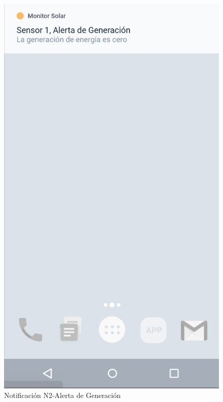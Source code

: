 \begin{figure}[H]
	\centering
	\includegraphics[scale=0.70]{Capitulo4/software/submodulos/images/notif_gen.png}
	\caption{Notificación N2-Alerta de Generación}
	\label{fig:Alerta Generacion}
\end{figure}

